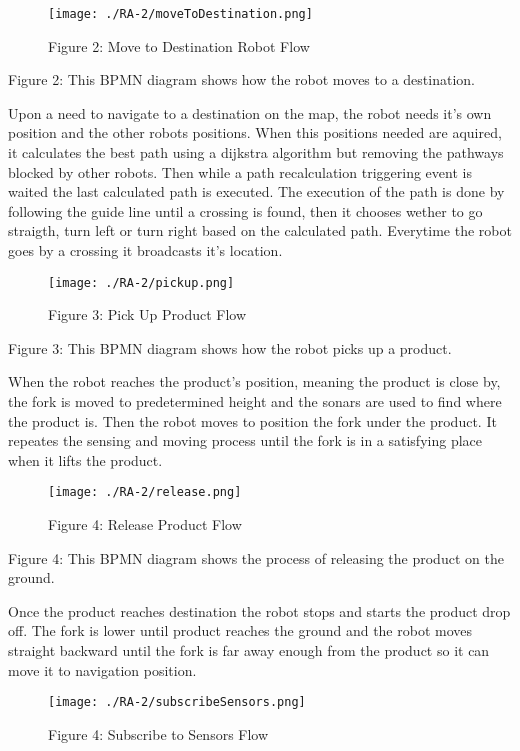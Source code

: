 \begin{figure}[ht!]
 \centering
 \texttt{[image: ./RA-2/moveToDestination.png]}
 \caption{Figure 2: Move to Destination Robot Flow}
 \label{fig:movetodestination}
\end{figure}
Figure 2: This BPMN diagram shows how the robot moves to a destination.

Upon a need to navigate to a destination on the map, the robot needs it's own position and the other robots positions. When this positions needed are aquired, it calculates the best path using a dijkstra algorithm but removing the pathways blocked by other robots. Then while a path recalculation triggering event is waited the last calculated path is executed. The execution of the path is done by following the guide line until a crossing is found, then it chooses wether to go straigth, turn left or turn right based on the calculated path. Everytime the robot goes by a crossing it broadcasts it's location.

\begin{figure}[ht!]
 \centering
 \texttt{[image: ./RA-2/pickup.png]}
 \caption{Figure 3: Pick Up Product Flow}
 \label{fig:pickup}
\end{figure}

Figure 3: This BPMN diagram shows how the robot picks up a product.

When the robot reaches the product's position, meaning the product is close by, the fork is moved to predetermined height and the sonars are used to find where the product is. Then the robot moves to position the fork under the product. It repeates the sensing and moving process until the fork is in a satisfying place when it lifts the product.

\begin{figure}[ht!]
 \centering
 \texttt{[image: ./RA-2/release.png]}
 \caption{Figure 4: Release Product Flow}
 \label{fig:release}
\end{figure}

Figure 4: This BPMN diagram shows the process of releasing the product on the ground.

Once the product reaches destination the robot stops and starts the product drop off. The fork is lower until product reaches the ground and the robot moves straight backward until the fork is far away enough from the product so it can move it to navigation position.

\begin{figure}[ht!]
 \centering
 \texttt{[image: ./RA-2/subscribeSensors.png]}
 \caption{Figure 4: Subscribe to Sensors Flow}
 \label{fig:subscribeSensors}
\end{figure}

